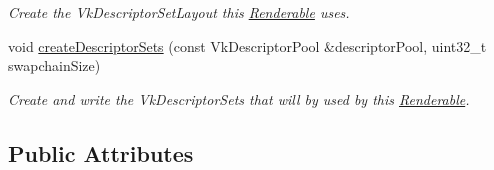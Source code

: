 \begin{DoxyCompactItemize}
\begin{DoxyCompactList}\small\item\em Create the Vk\+Descriptor\+Set\+Layout this \mbox{\hyperlink{class_renderable}{Renderable}} uses. \end{DoxyCompactList}\item 
void \mbox{\hyperlink{class_renderable_a3c39d0269a96782e17df8df793ea2286}{create\+Descriptor\+Sets}} (const Vk\+Descriptor\+Pool \&descriptor\+Pool, uint32\+\_\+t swapchain\+Size)
\begin{DoxyCompactList}\small\item\em Create and write the Vk\+Descriptor\+Sets that will by used by this \mbox{\hyperlink{class_renderable}{Renderable}}. \end{DoxyCompactList}\end{DoxyCompactItemize}
\subsection*{Public Attributes}
